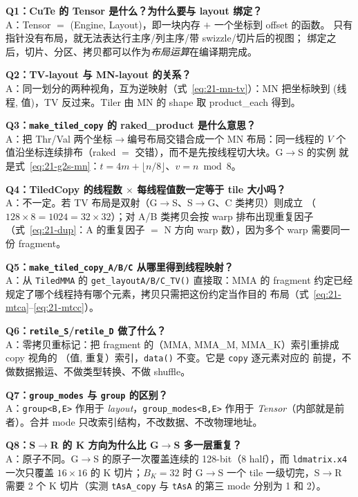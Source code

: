 \textbf{Q1：CuTe 的 Tensor 是什么？为什么要与 layout 绑定？}\\
A：Tensor $=$ (Engine, Layout)，即一块内存 $+$ 一个坐标到 offset 的函数。
只有指针没有布局，就无法表达行主序/列主序/带 swizzle/切片后的视图；
绑定之后，切片、分区、拷贝都可以作为\emph{布局运算}在编译期完成。

\textbf{Q2：TV-layout 与 MN-layout 的关系？}\\
A：同一划分的两种视角，互为逆映射（式~\eqref{eq:21-mn-tv}）：MN 把坐标映到
(线程, 值)，TV 反过来。Tiler 由 MN 的 shape 取 product\_each 得到。

\textbf{Q3：\texttt{make\_\allowbreak{}tiled\_\allowbreak{}copy} 的 raked\_product 是什么意思？}\\
A：把 Thr/Val 两个坐标$\to$编号布局交错合成一个 MN 布局：同一线程的 $V$
个值沿坐标连续排布（raked $=$ 交错），而不是先按线程切大块。G$\to$S 的实例
就是式~\eqref{eq:21-g2s-mn}：$t=4m+\lfloor n/8\rfloor$、$v=n\bmod 8$。

\textbf{Q4：TiledCopy 的线程数 $\times$ 每线程值数一定等于 tile 大小吗？}\\
A：不一定。若 TV 布局是双射（G$\to$S、S$\to$G、C 类拷贝）则成立
（$128\times8=1024=32\times32$）；对 A/B 类拷贝会按 warp 排布出现重复因子
（式~\eqref{eq:21-dup}：A 的重复因子 $=$ N 方向 warp 数），因为多个 warp
需要同一份 fragment。

\textbf{Q5：\texttt{make\_\allowbreak{}tiled\_\allowbreak{}copy\_\allowbreak{}A/\allowbreak{}B/\allowbreak{}C} 从哪里得到线程映射？}\\
A：从 \texttt{TiledMMA} 的 \texttt{get\_\allowbreak{}layout\allowbreak{}A/\allowbreak{}B/\allowbreak{}C\_\allowbreak{}TV\allowbreak{}()} 直接取：MMA 的
fragment 约定已经规定了哪个线程持有哪个元素，拷贝只需把这份约定当作目的
布局（式~\eqref{eq:21-mtca}--\eqref{eq:21-mtcc}）。

\textbf{Q6：\texttt{retile\_S}/\texttt{retile\_D} 做了什么？}\\
A：零拷贝重标记：把 fragment 的（MMA, MMA\_M, MMA\_K）索引重排成 copy 视角的
（值, 重复）索引，\texttt{data()} 不变。它是 \texttt{copy} 逐元素对应的
前提，不做数据搬运、不做类型转换、不做 shuffle。

\textbf{Q7：\texttt{group\_modes} 与 \texttt{group} 的区别？}\\
A：\texttt{group<B,E>} 作用于 \emph{layout}，\texttt{group\_\allowbreak{}modes\allowbreak{}<B,\allowbreak{}E>} 作用于
\emph{Tensor}（内部就是前者）。合并 mode 只改索引结构，不改数据、不改物理地址。

\textbf{Q8：S$\to$R 的 K 方向为什么比 G$\to$S 多一层重复？}\\
A：原子不同。G$\to$S 的原子一次覆盖连续的 128-bit（8 half），而
\texttt{ldmatrix.x4} 一次只覆盖 $16\times16$ 的 K 切片；$B_K=32$ 时
G$\to$S 一个 tile 一级切完，S$\to$R 需要 2 个 K 切片（实测
\texttt{tAsA\_copy} 与 \texttt{tAsA} 的第三 mode 分别为 1 和 2）。

